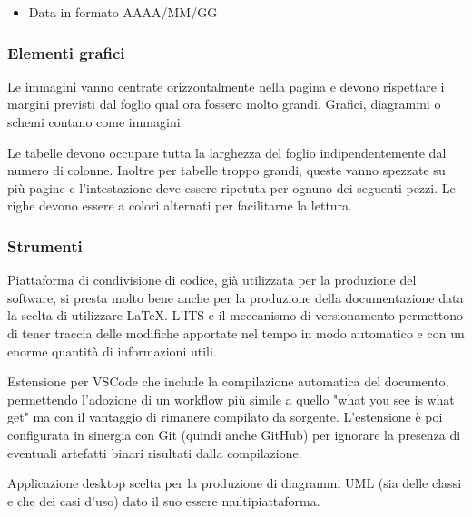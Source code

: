     \begin{itemize}
    \item Data in formato AAAA/MM/GG
    \end{itemize}

\subsubsection{Elementi grafici}

    Le immagini vanno centrate orizzontalmente nella pagina e devono rispettare i margini previsti dal foglio qual ora
    fossero molto grandi.
    Grafici, diagrammi o schemi contano come immagini.

    Le tabelle devono occupare tutta la larghezza del foglio indipendentemente dal numero di colonne.
    Inoltre per tabelle troppo grandi, queste vanno spezzate su più pagine e l'intestazione deve essere ripetuta
    per ognuno dei seguenti pezzi.
    Le righe devono essere a colori alternati per facilitarne la lettura.

\subsubsection{Strumenti}

    Piattaforma di condivisione di codice, già utilizzata per la produzione del software, si presta
    molto bene anche per la produzione della documentazione data la scelta di utilizzare \LaTeX.
    L'ITS e il meccanismo di versionamento permettono di tener traccia delle modifiche apportate nel tempo
    in modo automatico e con un enorme quantità di informazioni utili.

    Estensione per VSCode che include la compilazione automatica del documento, permettendo l'adozione di un workflow più simile
    a quello "what you see is what get" ma con il vantaggio di rimanere compilato da sorgente.
    L'estensione è poi configurata in sinergia con Git (quindi anche GitHub) per ignorare la presenza di eventuali artefatti binari
    risultati dalla compilazione.

    Applicazione desktop scelta per la produzione di diagrammi UML (sia delle classi e che dei casi d'uso) dato il suo essere
    multipiattaforma.
